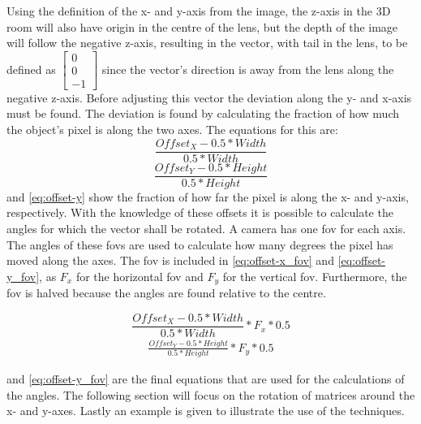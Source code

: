 Using the definition of the x- and y-axis from the image, the z-axis in the 3D room will also have origin in the centre of the lens, but the depth of the image will follow the negative z-axis, resulting in the vector, with tail in the lens, to be defined as
$\left[\!\begin{array}{c}
0\\
0\\
-1
\end{array}\!\right] $
since the vector's direction is away from the lens along the negative z-axis. Before adjusting this vector the deviation along the y- and x-axis must be found. The deviation is found by calculating the fraction of how much the object's pixel is along the two axes. The equations for this are:
\begin{equation}
\frac{Offset_X - 0.5 * Width}{0.5 * Width} \label{eq:offset-x}
\end{equation}
\begin{equation}
\frac{Offset_Y - 0.5 * Height}{0.5 * Height} \label{eq:offset-y}
\end{equation}
 and \cref{eq:offset-y} show the fraction of how far the pixel is along the x- and y-axis, respectively. With the knowledge of these offsets it is possible to calculate the angles for which the vector shall be rotated. A camera has one \acrfull{fov} for each axis. The angles of these \glspl{fov} are used to calculate how many degrees the pixel has moved along the axes. The \gls{fov} is included in \cref{eq:offset-x_fov} and \cref{eq:offset-y_fov}, as $F_x$ for the horizontal \gls{fov} and $F_y$ for the vertical \gls{fov}. Furthermore, the \gls{fov} is halved because the angles are found relative to the centre.

\begin{equation}
\frac{Offset_X - 0.5 * Width}{0.5 * Width}*F_x*0.5 \label{eq:offset-x_fov}
\end{equation}
\begin{align}
\frac{Offset_Y - 0.5 * Height}{0.5 * Height}*F_y*0.5 \label{eq:offset-y_fov}
\end{align}

 and \cref{eq:offset-y_fov} are the final equations that are used for the calculations of the angles. The following section will focus on the rotation of matrices around the x- and y-axes. Lastly an example is given to illustrate the use of the techniques.